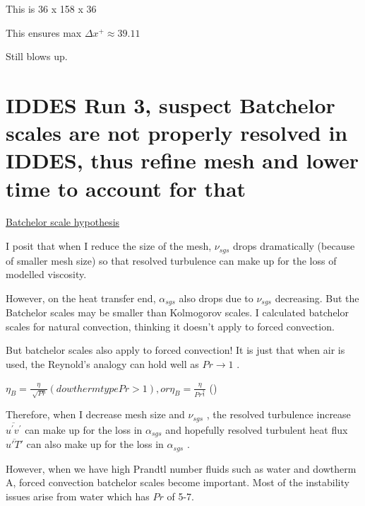 \documentclass[12pt]{article}
\renewcommand{\_}{\kern-1.5pt\textunderscore\kern-1.5pt}
\begin{document}
This is 36 x 158 x 36\par

This ensures max  \(  \Delta x^{+} \approx 39.11 \) \par

Still blows up.\par


\section{IDDES Run 3, suspect Batchelor scales are not properly resolved in IDDES, thus refine mesh and lower time to account for that}
\uline{Batchelor scale hypothesis}\par

I posit that when I reduce the size of the mesh,  \(  \nu _{sgs} \)  drops dramatically (because of smaller mesh size) so that resolved turbulence can make up for the loss of modelled viscosity.\par

However, on the heat transfer end,  \(  \alpha _{sgs} \)  also drops due to  \(  \nu _{sgs} \)  decreasing. But the Batchelor scales may be smaller than Kolmogorov scales. I calculated batchelor scales for natural convection, thinking it doesn’t apply to forced convection.\par


\vspace{\baselineskip}
But batchelor scales also apply to forced convection! It is just that when air is used, the Reynold’s analogy can hold well as  \( Pr \rightarrow 1 \) .\par

 \(  \eta _{B}=\frac{ \eta }{\sqrt[]{Pr}}  \left( dowtherm type Pr>1 \right) , or  \eta _{B}=\frac{ \eta }{Pr^{\frac{3}{4}}} \)  (\cite{Haren2011}) \par

\vspace{\baselineskip}
Therefore, when I decrease mesh size and  \(  \nu _{sgs} \) , the resolved turbulence increase   \( \overline{u^{'}v^{'}} \)  can make up for the loss in  \(  \alpha _{sgs} \)  and hopefully resolved turbulent heat flux   \( \overline{u'T'} \)  can also make up for the loss in  \(  \alpha _{sgs} \) .\par

However, when we have high Prandtl number fluids such as water and dowtherm A, forced convection batchelor scales become important. Most of the instability issues arise from water which has  \( Pr \)  of 5-7.\par
\end{document}
